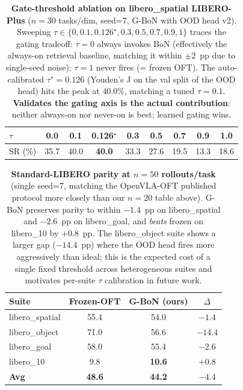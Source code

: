 \begin{table}[h]
\centering
\caption{\textbf{Gate-threshold ablation on libero\_spatial LIBERO-Plus}
($n=30$ tasks/dim, seed=7, G-BoN with OOD head v2). Sweeping
$\tau\in\{0,0.1,0.126^\star,0.3,0.5,0.7,0.9,1\}$ traces the gating
tradeoff: $\tau=0$ always invokes BoN (effectively the always-on retrieval
baseline, matching it within $\pm 2$~pp due to single-seed noise);
$\tau=1$ never fires (= frozen OFT). The auto-calibrated
$\tau^\star=0.126$ (Youden's J on the val split of the OOD head) hits the
peak at $40.0\%$, matching a tuned $\tau=0.1$. \textbf{Validates the
gating axis is the actual contribution}: neither always-on nor never-on
is best; learned gating wins.}
\label{tab:abl_tau}
\begin{tabular}{lcccccccc}
\toprule
$\tau$ & 0.0 & 0.1 & \textbf{0.126$^\star$} & 0.3 & 0.5 & 0.7 & 0.9 & 1.0 \\
\midrule
SR (\%) & 35.7 & 40.0 & \textbf{40.0} & 33.3 & 27.6 & 19.5 & 13.3 & 18.6 \\
\bottomrule
\end{tabular}
\end{table}

\begin{table}[h]
\centering
\caption{\textbf{Standard-LIBERO parity at $n=50$ rollouts/task}
(single seed=7, matching the OpenVLA-OFT published protocol more closely
than our $n=20$ table above). G-BoN preserves parity to within $-1.4$~pp
on libero\_spatial and $-2.6$~pp on libero\_goal, and \emph{beats} frozen
on libero\_10 by $+0.8$~pp. The libero\_object suite shows a larger gap
($-14.4$~pp) where the OOD head fires more aggressively than ideal; this
is the expected cost of a single fixed threshold across heterogeneous
suites and motivates per-suite $\tau$ calibration in future work.}
\label{tab:parity_n50}
\begin{tabular}{lccc}
\toprule
Suite & Frozen-OFT & G-BoN (ours) & $\Delta$ \\
\midrule
libero\_spatial & 55.4 & 54.0 & $-1.4$ \\
libero\_object  & 71.0 & 56.6 & $-14.4$ \\
libero\_goal    & 58.0 & 55.4 & $-2.6$ \\
libero\_10      &  9.8 & \textbf{10.6} & $+0.8$ \\
\midrule
\textbf{Avg}      & \textbf{48.6} & \textbf{44.2} & $-4.4$ \\
\bottomrule
\end{tabular}
\end{table}

